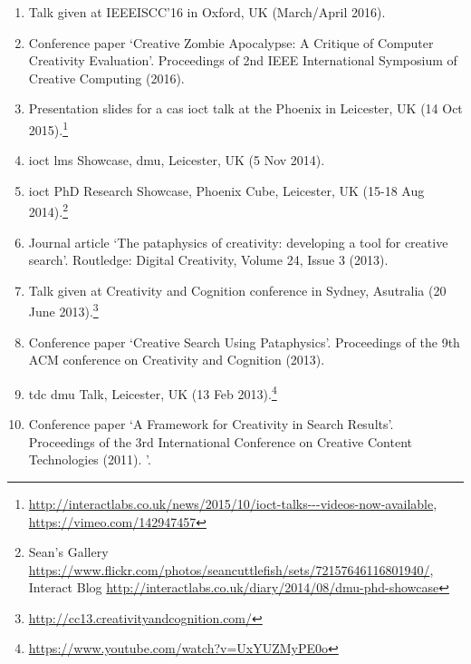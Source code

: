 \begin{enumerate}
  \item Talk given at IEEEISCC'16 in Oxford, UK (March/April 2016).
  \item Conference paper `Creative Zombie Apocalypse: A Critique of Computer Creativity Evaluation'. Proceedings of 2nd IEEE International Symposium of Creative Computing (2016).
  \item Presentation slides for a \gls{cas} \gls{ioct} talk at the Phoenix in Leicester, UK (14 Oct 2015).\footnote{\url{http://interactlabs.co.uk/news/2015/10/ioct-talks---videos-now-available}, \url{https://vimeo.com/142947457}}
  \item \gls{ioct} \gls{lms} Showcase, \gls{dmu}, Leicester, UK (5 Nov 2014).
  \item \gls{ioct} PhD Research Showcase, Phoenix Cube, Leicester, UK (15-18 Aug 2014).\footnote{Sean's Gallery \url{https://www.flickr.com/photos/seancuttlefish/sets/72157646116801940/}, Interact Blog \url{http://interactlabs.co.uk/diary/2014/08/dmu-phd-showcase}}
  \item Journal article `The pataphysics of creativity: developing a tool for creative search'. Routledge: Digital Creativity, Volume 24, Issue 3 (2013).
  \item Talk given at Creativity and Cognition conference in Sydney, Asutralia (20 June 2013).\footnote{\url{http://cc13.creativityandcognition.com/}}
  \item Conference paper `Creative Search Using Pataphysics'. Proceedings of the 9th ACM conference on Creativity and Cognition (2013).
  \item \gls{tdc} \gls{dmu} Talk, Leicester, UK (13 Feb 2013).\footnote{\url{https://www.youtube.com/watch?v=UxYUZMyPE0o}}
  \item Conference paper `A Framework for Creativity in Search Results'. Proceedings of the 3rd International Conference on Creative Content Technologies (2011).
'.
\end{enumerate}

\addtocounter{section}{1}



\addtocounter{section}{1}



